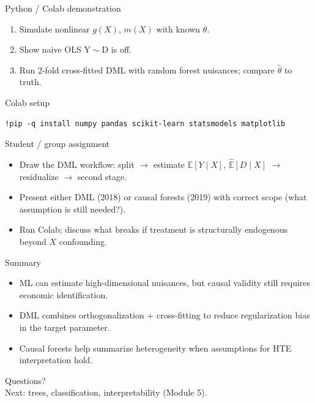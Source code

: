 \documentclass[aspectratio=169,11pt]{beamer}
\begin{document}
\begin{frame}{Python / Colab demonstration}
  \begin{enumerate}
    \item Simulate nonlinear \(g(X)\), \(m(X)\) with known \(\theta\).
    \item Show naive OLS \(\mathrm{Y \sim D}\) is off.
    \item Run 2-fold cross-fitted DML with random forest nuisances; compare \(\widehat{\theta}\) to truth.
  \end{enumerate}
\end{frame}

\begin{frame}[fragile]{Colab setup}
  \begin{verbatim}
!pip -q install numpy pandas scikit-learn statsmodels matplotlib
  \end{verbatim}
\end{frame}

\begin{frame}{Student / group assignment}
  \begin{itemize}
    \item Draw the DML workflow: split \(\rightarrow\) estimate \(\widehat{\mathbb{E}}[Y\mid X]\), \(\widehat{\mathbb{E}}[D\mid X]\) \(\rightarrow\) residualize \(\rightarrow\) second stage.
    \item Present either DML (2018) or causal forests (2019) with correct scope (what assumption is still needed?).
    \item Run Colab; discuss what breaks if treatment is structurally endogenous beyond \(X\) confounding.
  \end{itemize}
\end{frame}

\begin{frame}{Summary}
  \begin{itemize}
    \item ML can estimate high-dimensional nuisances, but causal validity still requires economic identification.
    \item DML combines orthogonalization + cross-fitting to reduce regularization bias in the target parameter.
    \item Causal forests help summarize heterogeneity when assumptions for HTE interpretation hold.
  \end{itemize}
\end{frame}

\begin{frame}[plain]
  \begin{center}
    \Large Questions?\\[0.8em]
    \normalsize Next: trees, classification, interpretability (Module 5).
  \end{center}
\end{frame}
\end{document}
